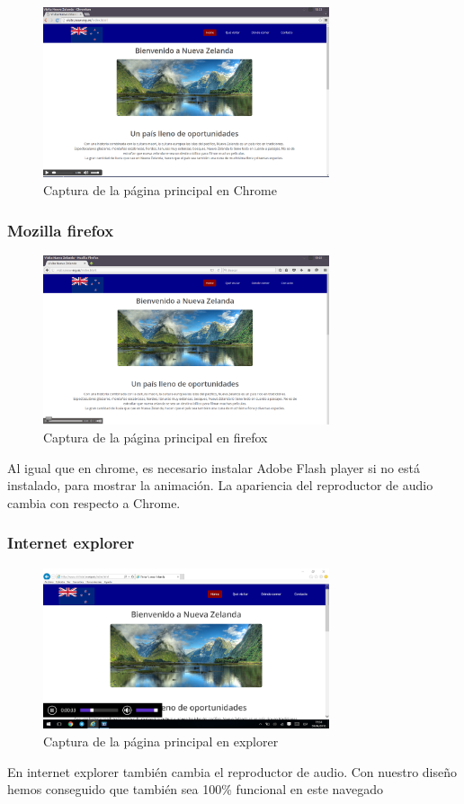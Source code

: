 \begin{figure}[h]
	\centering
	\includegraphics[width=0.75\textwidth]{./Fotos/chrome-capture.png}
	\caption{Captura de la página principal en Chrome}
	\label{fig: ejemplo}
\end{figure}

\subsubsection{Mozilla firefox}
\begin{figure}[h]
	\centering
	\includegraphics[width=0.75\textwidth]{./Fotos/firefox-capture.png}
	\caption{Captura de la página principal en firefox}
	\label{fig: ejemplo}
\end{figure}
Al igual que en chrome, es necesario instalar Adobe Flash player si no está instalado, para mostrar la animación. La apariencia del reproductor de audio cambia con respecto a Chrome.

\subsubsection{Internet explorer}
\begin{figure}[h]
	\centering
	\includegraphics[width=0.75\textwidth]{./Fotos/explorer-capture.png}
	\caption{Captura de la página principal en explorer}
	\label{fig: ejemplo}
	
\end{figure}
En internet explorer también cambia el reproductor de audio. Con nuestro diseño hemos conseguido que también sea 100\% funcional en este navegado
